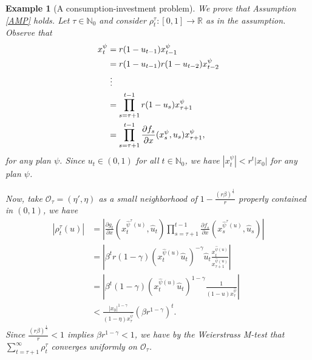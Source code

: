 \documentclass[3p]{elsarticle}
\newcommand{\rz}{\mathbb R}
\newcommand{\nat}{\mathbb N_0}
\newtheorem{examp}[thm]{Example}
\begin{document}
\begin{examp}[A consumption-investment problem]
		We prove that Assumption \ref{AMP} holds. Let $\tau\in\nat$ and consider $\rho_t^\tau:[0,1]\to\rz$ as in the assumption. Observe that 
		\begin{align*}
		x_t^\psi&=r(1-u_{t-1})x^\psi_{t-1}\\
		&=r(1-u_{t-1})r(1-u_{t-2})x^\psi_{t-2}\\
		& \hspace{0.1cm}\vdots\\
		&=\prod_{s=\tau+1}^{t-1}r(1-u_s)x^\psi_{\tau+1}\\
		&=\prod_{s=\tau+1}^{t-1}\frac{\partial f_s}{\partial x}(x_s^\psi,u_s)x^\psi_{\tau+1},
		\end{align*}
		for any plan $\psi$. Since $u_t\in(0,1)$ for all $t\in\nat$, we have $|x_t^\psi|<r^t|x_0|$ for any plan $\psi$.
		
		Now, take $\mathcal O_\tau=(\eta',\eta)$ as a small neighborhood of $1-\displaystyle\frac{(r\beta)^{\frac{1}{\gamma}}}{r}$ properly contained in $(0,1)$, we have
		\begin{align*}
		\left|\rho_t^{\tau}(u)\right|&=\left|\frac{\partial g_t}{\partial x}( x_t^{{\hat\psi^\tau(u)}}, \hat u_t)\prod_{s=\tau+1}^{t-1}\frac{\partial f_s}{\partial x}(x_s^{{\hat \psi^\tau(u)}}, \hat u_s)\right|\\
		&=\left|\beta^tr(1-\gamma)(x_t^{\hat\psi(u)}\hat u_t)^{-\gamma}\hat u_t\frac{x_t^{\hat\psi(u)}}{x_{\tau+1}^{\hat\psi(u)}}\right|\\
		&=\left|\beta^t(1-\gamma)(x_t^{\hat\psi(u)}\hat u_t)^{1-\gamma}\frac{1}{(1-u)x_{\tau}^{\hat\psi}}\right|\\
		&<\frac{\left|x
			_0\right|^{1-\gamma}}{(1-\eta) x_{\tau}^{\hat\psi}}(\beta r^{1-\gamma})^t.
		\end{align*}
		Since $\displaystyle\frac{(r\beta)^{\frac{1}{\gamma}}}{r}<1$ implies $\beta r^{1-\gamma}<1$, we have by the Weierstrass M-test that  $\displaystyle\sum_{t=\tau+1}^{\infty}\rho_t^\tau$ converges uniformly on $\mathcal O_\tau$.
	\end{examp}
	
\end{document}
